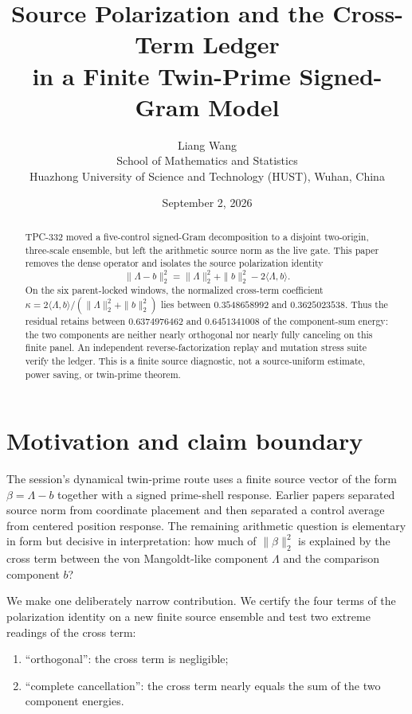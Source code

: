 \documentclass[10pt]{article}
\title{Source Polarization and the Cross-Term Ledger\\
\large in a Finite Twin-Prime Signed-Gram Model}
\author{Liang Wang\\School of Mathematics and Statistics\\
Huazhong University of Science and Technology (HUST), Wuhan, China}
\date{September 2, 2026}
\begin{document}
\maketitle

\begin{abstract}
TPC-332 moved a five-control signed-Gram decomposition to a disjoint
two-origin, three-scale ensemble, but left the arithmetic source norm as the
live gate.  This paper removes the dense operator and isolates the source
polarization identity
\[
 \|\Lambda-b\|_2^2=\|\Lambda\|_2^2+\|b\|_2^2-2\langle\Lambda,b\rangle.
\]
On the six parent-locked windows, the normalized cross-term coefficient
$\kappa=2\langle\Lambda,b\rangle/(\|\Lambda\|_2^2+\|b\|_2^2)$ lies between
$0.3548658992$ and $0.3625023538$.  Thus the residual retains between
$0.6374976462$ and $0.6451341008$ of the component-sum energy: the two
components are neither nearly orthogonal nor nearly fully canceling on this
finite panel.  An independent reverse-factorization replay and mutation
stress suite verify the ledger.  This is a finite source diagnostic, not a
source-uniform estimate, power saving, or twin-prime theorem.
\end{abstract}

\section{Motivation and claim boundary}

The session's dynamical twin-prime route uses a finite source vector of the
form $\beta=\Lambda-b$ together with a signed prime-shell response.  Earlier
papers separated source norm from coordinate placement and then separated a
control average from centered position response.  The remaining arithmetic
question is elementary in form but decisive in interpretation: how much of
$\|\beta\|_2^2$ is explained by the cross term between the von Mangoldt-like
component $\Lambda$ and the comparison component $b$?

We make one deliberately narrow contribution.  We certify the four terms of
the polarization identity on a new finite source ensemble and test two
extreme readings of the cross term:

\begin{enumerate}
\item ``orthogonal'': the cross term is negligible;
\item ``complete cancellation'': the cross term nearly equals the sum of
      the two component energies.
\end{enumerate}
\end{document}
